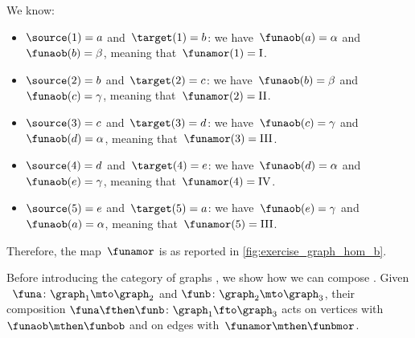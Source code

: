 \begin{solution}
    We know:
    \begin{itemize}
        \item $\source(1)=a$ and~$\target(1)=b$: we have~$\funaob(a)=\alpha$ and~$\funaob(b)=\beta$, meaning that~$\funamor(1)=\text{I}$.
        \item $\source(2)=b$ and~$\target(2)=c$: we have~$\funaob(b)=\beta$ and~$\funaob(c)=\gamma$, meaning that~$\funamor(2)=\text{II}$.
        \item $\source(3)=c$ and~$\target(3)=d$: we have~$\funaob(c)=\gamma$ and~$\funaob(d)=\alpha$, meaning that~$\funamor(3)=\text{III}$.
        \item $\source(4)=d$ and~$\target(4)=e$: we have~$\funaob(d)=\alpha$ and~$\funaob(e)=\gamma$, meaning that~$\funamor(4)=\text{IV}$.
        \item $\source(5)=e$ and~$\target(5)=a$: we have~$\funaob(e)=\gamma$ and~$\funaob(a)=\alpha$, meaning that~$\funamor(5)=\text{III}$.
    \end{itemize}
    Therefore, the map~$\funamor$ is as reported in \cref{fig:exercise_graph_hom_b}.

    \begin{marginfigure}
        \centering
        \caption{}
        \label{fig:exercise_graph_hom_b}
    \end{marginfigure}
\end{solution}



Before introducing the category of graphs \Grph, we show how we can compose .
Given ~$\funa\colon \graph_1\mto \graph_2$ and $\funb\colon \graph_2\mto \graph_3$, their composition $\funa\fthen \funb \colon \graph_1 \fto \graph_3$ acts on vertices with~$\funaob \mthen \funbob$ and on edges with~$\funamor \mthen \funbmor$.

